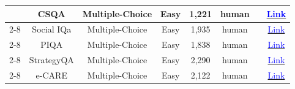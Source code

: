 \begin{table}[!htp]
{\begin{tabular}{c|c|c|c|c|c|c|c}
                                                                                  & CSQA                   & Multiple-Choice         & Easy                & 1,221            & human               & \cite{xiong2023examining}                                                                                                                                                       & \href{https://www.tau-nlp.org/commonsenseqa}{\textcolor{blue}{Link}}                                                                                              \\ \cline{2-8}
                                                                                  & Social IQa             & Multiple-Choice         & Easy                & 1,935            & human               & \cite{xiong2023examining}                                                                                                                                                       & \href{https://huggingface.co/datasets/allenai/social_i_qa}{\textcolor{blue}{Link}}                                                                                \\ \cline{2-8}
                                                                                  & PIQA                   & Multiple-Choice         & Easy                & 1,838            & human               & \cite{xiong2023examining,tan2024true}                                                                                         & \href{https://huggingface.co/datasets/ybisk/piqa}{\textcolor{blue}{Link}}                                                                                         \\ \cline{2-8}
                                                                                  & StrategyQA             & Multiple-Choice         & Easy                & 2,290            & human               & \cite{xiong2023examining}                                                                                                                                                       & \href{https://github.com/eladsegal/strategyqa}{\textcolor{blue}{Link}}                                                                                            \\ \cline{2-8}
                                                                                  & e-CARE                 & Multiple-Choice         & Easy                & 2,122            & human               & \cite{xiong2023examining}                                                                                                                                                       & \href{https://github.com/waste-wood/e-care}{\textcolor{blue}{Link}}                                                                                               \\ \hline









\end{tabular}}
\end{table}
